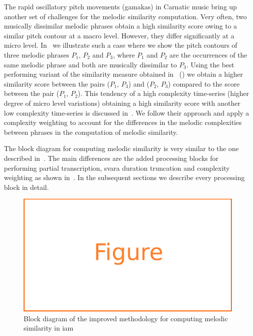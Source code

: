 The rapid oscillatory pitch movements (\glspl{gamaka}) in Carnatic music bring up another set of challenges for the melodic similarity computation. Very often, two musically dissimilar melodic phrases obtain a high similarity score owing to a similar pitch contour at a macro level. However, they differ significantly at a micro level. In~ we illustrate such a case where we show the pitch contours of three melodic phrases $P_1$, $P_2$ and $P_3$, where $P_1$ and $P_2$ are the occurrences of the same melodic phrase and both are musically dissimilar to $P_3$. Using the best performing variant of the similarity measure obtained in~ () we obtain a higher similarity score between the pairs ($P_1$, $P_3$) and ($P_2$, $P_3$) compared to the score between the pair ($P_1$, $P_2$). This tendency of a high complexity time-series (higher degree of micro level variations) obtaining a high similarity score with another low complexity time-series is discussed in~\cite{batista2011complexity}. We follow their approach and apply a complexity weighting to account for the differences in the melodic complexities between phrases in the computation of melodic similarity. 


The block diagram for computing melodic similarity is very similar to the one described in~. The main differences are the added processing blocks for performing partial transcription, \gls{svara} duration truncation and complexity weighting as shown in~. In the subsequent sections we describe every processing block in detail. 

\begin{figure}
	\begin{center}
		\includegraphics[width=\figSizeEightyFive]{ch06_patterns/figures/figure_todo.pdf}
	\end{center}
	\caption{Block diagram of the improved methodology for computing melodic similarity in \gls{iam}} 
	\label{fig:block_diagram_melodic_similarity_improved}
\end{figure}

